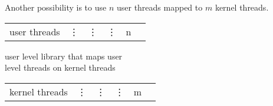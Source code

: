 \documentclass[a4paper,10pt]{article}
\begin{document}
Another possibility is to use $n$ user threads mapped to $m$ kernel threads.

\begin{tabular}{cccccc}
	user threads & \vdots & \vdots & \vdots & n
\end{tabular}

\begin{flushright}
	user level library that maps user
	\\
	level threads on kernel threads
\end{flushright}

\begin{tabular}{cccccc}
	kernel threads & \vdots & \vdots & \vdots & m
\end{tabular}

 
\end{document}

